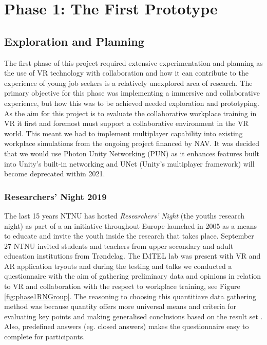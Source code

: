 
\chapter{Phase 1: The First Prototype}
\label{chap:phase1}

\section{Exploration and Planning}
The first phase of this project required extensive experimentation and planning as the use of VR technology with collaboration and how it can contribute to the experience of young job seekers is a relatively unexplored area of research. The primary objective for this phase was implementing a immersive and collaborative experience, but how this was to be achieved needed exploration and prototyping. As the aim for this project is to evaluate the collaborative workplace training in VR it first and foremost must support a collaborative environment in the VR world. This meant we had to implement multiplayer capability into existing workplace simulations from the ongoing project financed by NAV. It was decided that we would use Photon Unity Networking (PUN) \cite{PUN} as it enhances features built into Unity's built-in networking and UNet (Unity's multiplayer framework) will become deprecated within 2021.               

\subsection{Researchers' Night 2019}
The last 15 years NTNU has hosted \textit{Researchers' Night} (the youths research night) as part of a an initiative throughout Europe launched in 2005 as a means to educate and invite the youth inside the research that takes place. September 27 NTNU invited students and teachers from upper secondary and adult education institutions from Trøndelag. The IMTEL lab was present with VR and AR application tryouts and during the testing and talks we conducted a questionnaire with the aim of gathering preliminary data and opinions in relation to VR and collaboration with the respect to workplace training, see Figure \ref{fig:phase1RNGroup}. The reasoning to choosing this quantitiave data gathering method was because quantity offers more universal means and criteria for evaluating key points and making generalised conclusions based on the result set \cite{oates2005researching}. Also, predefined answers (eg. closed answers) makes the questionnaire easy to complete for participants.

